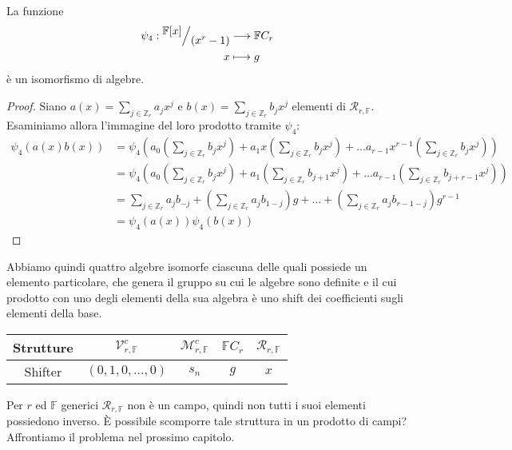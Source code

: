 \begin{prop}
La funzione
\begin{align*}
\psi_{4}: \quotient{ \mathbb{F}[x] }{ (x^r -1 )}
          &\longrightarrow
          \mathbb{F}C_{r} \\
              x
              &\longmapsto
              g
\end{align*}
è un isomorfismo di algebre.
\end{prop}

\begin{proof}
Siano $a(x) = \sum_{j \in \mathbb{Z}_{r} }a_{j} x^{j}$ e $b(x)= \sum_{j \in
\mathbb{Z}_{r} } b_{j} x^{j}$ elementi di $\mathcal{R}_{r, \mathbb{F}} $.
Esaminiamo allora l'immagine del loro prodotto tramite $\psi_{4}$:
\begin{align*}
\psi_{4}(a(x)b(x))
&= \psi_{4}(
a_{0}(\sum_{j \in \mathbb{Z}_{r} } b_{j} x^{j}) +
a_{1}x(\sum_{j \in \mathbb{Z}_{r} } b_{j} x^{j}) +
\dots
a_{r-1}x^{r-1}(\sum_{j \in \mathbb{Z}_{r} } b_{j} x^{j})
)
\\
&=
\psi_{4}(
a_{0}(\sum_{j \in \mathbb{Z}_{r} } b_{j} x^{j}) +
a_{1}(\sum_{j \in \mathbb{Z}_{r} } b_{j+1} x^{j}) +
\dots
a_{r-1}(\sum_{j \in \mathbb{Z}_{r} } b_{j+r-1} x^{j})
)
\\
&=
\sum_{j \in \mathbb{Z}_{r} } a_{j} b_{-j} +
(\sum_{j \in \mathbb{Z}_{r} } a_{j} b_{1-j})g +
\dots +
(\sum_{j \in \mathbb{Z}_{r} } a_{j} b_{r-1-j})g^{r-1}
\\
&=
\psi_{4}(a(x))\psi_{4}(b(x))
\end{align*}
\end{proof}

Abbiamo quindi quattro algebre isomorfe ciascuna delle quali possiede un
elemento particolare, che genera il gruppo su cui le algebre sono definite e il
cui prodotto con uno degli elementi della sua algebra è uno shift dei coefficienti sugli elementi della base.
\begin{center}
\begin{tabular}{ c | c c c c }
Strutture
&
$\mathcal{V}_{r, \mathbb{F}}^{c}$
&
$\mathcal{M}_{r,\mathbb{F} }^{c} $
&
$\mathbb{F}C_{r} $
&
$\mathcal{R}_{r, \mathbb{F}} $
\\
\hline
Shifter & $(0,1,0,\dots,0)$ & $s_n$ & $g$ & $x$
\end{tabular}
\end{center}
Per $r$ ed $\mathbb{F}$ generici $\mathcal{R}_{r, \mathbb{F}} $ non è un campo,
quindi non tutti i suoi elementi possiedono inverso. È possibile scomporre
tale struttura in un prodotto di campi?
Affrontiamo il problema nel prossimo capitolo.


